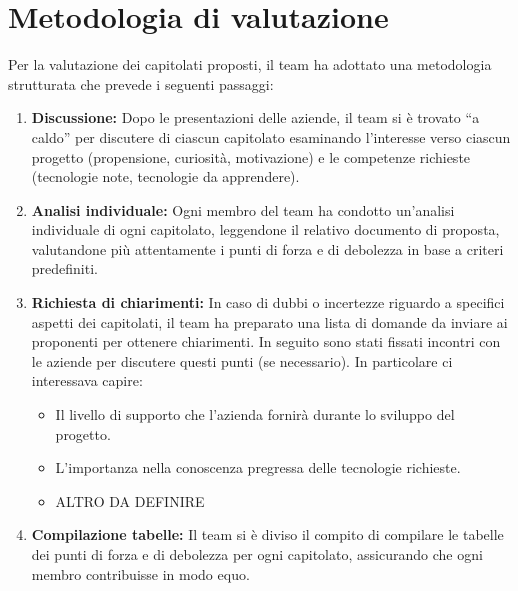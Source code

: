 \documentclass[a4paper,11pt]{article}
\begin{document}

\newpage
\tableofcontents

\newpage
\section{Metodologia di valutazione}
Per la valutazione dei capitolati proposti, il team ha adottato una metodologia strutturata che prevede i seguenti passaggi:
\begin{enumerate}
\item \textbf{Discussione:} Dopo le presentazioni delle aziende, il team si è trovato ``a caldo'' per discutere di ciascun capitolato esaminando l'interesse verso ciascun progetto (propensione, curiosità, motivazione) e le competenze richieste (tecnologie note, tecnologie da apprendere).
\item \textbf{Analisi individuale:} Ogni membro del team ha condotto un'analisi individuale di ogni capitolato, leggendone il relativo documento di proposta, valutandone più attentamente i punti di forza e di debolezza in base a criteri predefiniti.
\item \textbf{Richiesta di chiarimenti:} In caso di dubbi o incertezze riguardo a specifici aspetti dei capitolati, il team ha preparato una lista di domande da inviare ai proponenti per ottenere chiarimenti. In seguito sono stati fissati incontri con le aziende per discutere questi punti (se necessario).
  In particolare ci interessava capire:
  \begin{itemize}
    \item Il livello di supporto che l'azienda fornirà durante lo sviluppo del progetto.
    \item L'importanza nella conoscenza pregressa delle tecnologie richieste.
    \item ALTRO DA DEFINIRE
  \end{itemize}
\item \textbf{Compilazione tabelle:} Il team si è diviso il compito di compilare le tabelle dei punti di forza e di debolezza per ogni capitolato, assicurando che ogni membro contribuisse in modo equo.
\end{enumerate}
\end{document}
